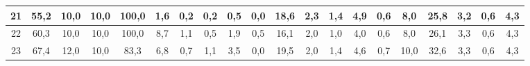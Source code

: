 \begin{sidewaystable}[]
\begin{tabular}{|c|c|c|c|c|c|c|c|c|c|c|c|c|c|c|c|c|c|c|c|}
    21 & 55,2                                            & 10,0                                            & 10,0                                            & 100,0                                           & 1,6                                             & 0,2                                             & 0,2                                             & 0,5                                             & 0,0                                             & 18,6                                             & 2,3                                              & 1,4                                              & 4,9                                              & 0,6                                              & 8,0                                              & 25,8                                             & 3,2                                              & 0,6                                              & 4,3                                              \\ \hline
    22 & 60,3                                            & 10,0                                            & 10,0                                            & 100,0                                           & 8,7                                             & 1,1                                             & 0,5                                             & 1,9                                             & 0,5                                             & 16,1                                             & 2,0                                              & 1,0                                              & 4,0                                              & 0,6                                              & 8,0                                              & 26,1                                             & 3,3                                              & 0,6                                              & 4,3                                              \\ \hline
    23 & 67,4                                            & 12,0                                            & 10,0                                            & 83,3                                            & 6,8                                             & 0,7                                             & 1,1                                             & 3,5                                             & 0,0                                             & 19,5                                             & 2,0                                              & 1,4                                              & 4,6                                              & 0,7                                              & 10,0                                             & 32,6                                             & 3,3                                              & 0,6                                              & 4,3                                              \\ \hline

\end{tabular}
\end{sidewaystable}
